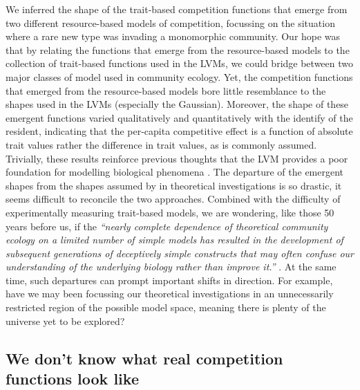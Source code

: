 \documentclass[a4paper,11pt]{article}
\begin{document}
We inferred the shape of the trait-based competition functions that emerge from two different resource-based models of competition, focussing on the situation where a rare new type was invading a monomorphic community. Our hope was that by relating the functions that emerge from the resource-based models to the collection of trait-based functions used in the LVMs, we could bridge between two major classes of model used in community ecology. Yet, the competition functions that emerged from the resource-based models bore little resemblance to the shapes used in the LVMs (especially the Gaussian). Moreover, the shape of these emergent functions varied qualitatively and quantitatively with the identify of the resident, indicating that the per-capita competitive effect is a function of absolute trait values rather the difference in trait values, as is commonly assumed. Trivially, these results reinforce previous thoughts that the LVM provides a poor foundation for modelling biological phenomena \citep[e.g.]{Andrewartha-1953,  Neill-1974, Abrams-1975, Wangersky-1978, Abrams-1980, Tilman-1987, Abrams-2008}. The departure of the emergent shapes from the shapes assumed by in theoretical investigations is so drastic, it seems difficult to reconcile the two approaches. Combined with the difficulty of experimentally measuring trait-based models, we are wondering, like those 50 years before us, if the  \emph{``nearly complete dependence of theoretical community ecology on a limited number of simple models has resulted in the development of subsequent generations of deceptively simple constructs that may often confuse our understanding of the underlying biology rather than improve it.''}  \citep{Neill-1974}. At the same time, such departures can prompt important shifts in direction. For example, have we may been focussing our theoretical investigations in an unnecessarily restricted region of the possible model space, meaning there is plenty of the universe yet to be explored?

\subsection{We don't know what real competition functions look like}
\end{document}
